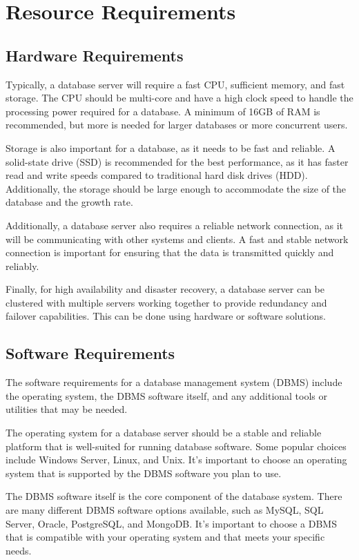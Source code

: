 \chapter{Resource Requirements}
\section{Hardware Requirements}
Typically, a database server will require a fast CPU, sufficient memory, and fast storage. The CPU should be multi-core and have a high clock speed to handle the processing power required for a database. A minimum of 16GB of RAM is recommended, but more is needed for larger databases or more concurrent users.

Storage is also important for a database, as it needs to be fast and reliable. A solid-state drive (SSD) is recommended for the best performance, as it has faster read and write speeds compared to traditional hard disk drives (HDD). Additionally, the storage should be large enough to accommodate the size of the database and the growth rate.

Additionally, a database server also requires a reliable network connection, as it will be communicating with other systems and clients. A fast and stable network connection is important for ensuring that the data is transmitted quickly and reliably.

Finally, for high availability and disaster recovery, a database server can be clustered with multiple servers working together to provide redundancy and failover capabilities. This can be done using hardware or software solutions.
\section{Software Requirements} 
The software requirements for a database management system (DBMS) include the operating system, the DBMS software itself, and any additional tools or utilities that may be needed.

The operating system for a database server should be a stable and reliable platform that is well-suited for running database software. Some popular choices include Windows Server, Linux, and Unix. It's important to choose an operating system that is supported by the DBMS software you plan to use.

The DBMS software itself is the core component of the database system. There are many different DBMS software options available, such as MySQL, SQL Server, Oracle, PostgreSQL, and MongoDB. It's important to choose a DBMS that is compatible with your operating system and that meets your specific needs.

